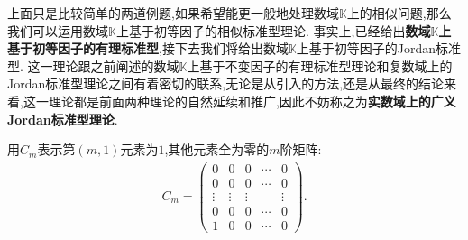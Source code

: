 \documentclass[../../main.tex]{subfiles}
\begin{document}
\vspace{0.5cm}

上面只是比较简单的两道例题,如果希望能更一般地处理数域$\mathbb{K}$上的相似问题,那么我们可以运用数域$\mathbb{K}$上基于初等因子的相似标准型理论. 事实上,已经给出\textbf{数域$\mathbb{K}$上基于初等因子的有理标准型},接下去我们将给出数域$\mathbb{K}$上基于初等因子的Jordan标准型. 这一理论跟之前阐述的数域$\mathbb{K}$上基于不变因子的有理标准型理论和复数域上的Jordan标准型理论之间有着密切的联系,无论是从引入的方法,还是从最终的结论来看,这一理论都是前面两种理论的自然延续和推广,因此不妨称之为\textbf{实数域上的广义Jordan标准型理论}. 

\vspace{0.5cm}

\begin{definition}
用$C_m$表示第$(m,1)$元素为$1$,其他元素全为零的$m$阶矩阵:
\begin{align*}
C_m = 
\begin{pmatrix}
0 & 0 & 0 & \cdots & 0 \\
0 & 0 & 0 & \cdots & 0 \\
\vdots & \vdots & \vdots & & \vdots \\
0 & 0 & 0 & \cdots & 0 \\
1 & 0 & 0 & \cdots & 0
\end{pmatrix}.
\end{align*}
\end{definition}
\end{document}

